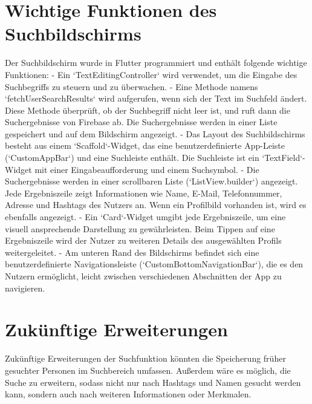 \section*{Wichtige Funktionen des Suchbildschirms}
Der Suchbildschirm wurde in Flutter programmiert und enthält folgende wichtige Funktionen:
- Ein `TextEditingController` wird verwendet, um die Eingabe des Suchbegriffs zu steuern und zu überwachen.
- Eine Methode namens `fetchUserSearchResults` wird aufgerufen, wenn sich der Text im Suchfeld ändert. Diese Methode überprüft, ob der Suchbegriff nicht leer ist, und ruft dann die Suchergebnisse von Firebase ab. Die Suchergebnisse werden in einer Liste gespeichert und auf dem Bildschirm angezeigt.
- Das Layout des Suchbildschirms besteht aus einem `Scaffold`-Widget, das eine benutzerdefinierte App-Leiste (`CustomAppBar`) und eine Suchleiste enthält. Die Suchleiste ist ein `TextField`-Widget mit einer Eingabeaufforderung und einem Suchsymbol.
- Die Suchergebnisse werden in einer scrollbaren Liste (`ListView.builder`) angezeigt. Jede Ergebniszeile zeigt Informationen wie Name, E-Mail, Telefonnummer, Adresse und Hashtags des Nutzers an. Wenn ein Profilbild vorhanden ist, wird es ebenfalls angezeigt.
- Ein `Card`-Widget umgibt jede Ergebniszeile, um eine visuell ansprechende Darstellung zu gewährleisten. Beim Tippen auf eine Ergebniszeile wird der Nutzer zu weiteren Details des ausgewählten Profils weitergeleitet.
- Am unteren Rand des Bildschirms befindet sich eine benutzerdefinierte Navigationsleiste (`CustomBottomNavigationBar`), die es den Nutzern ermöglicht, leicht zwischen verschiedenen Abschnitten der App zu navigieren.

\section*{Zukünftige Erweiterungen}
Zukünftige Erweiterungen der Suchfunktion könnten die Speicherung früher gesuchter Personen im Suchbereich umfassen. Außerdem wäre es möglich, die Suche zu erweitern, sodass nicht nur nach Hashtags und Namen gesucht werden kann, sondern auch nach weiteren Informationen oder Merkmalen.

